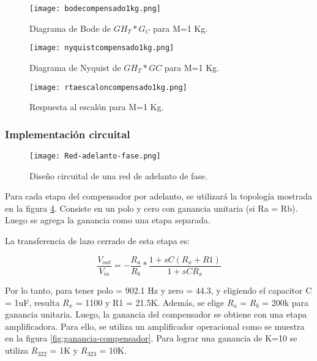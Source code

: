 \begin{figure}[H]
	\centering
	\texttt{[image: bodecompensado1kg.png]}
	\caption{Diagrama de Bode de $GH_T*G_C$ para M=1 Kg.}
	\label{fig:bode-analog-para-M-1Kg}
\end{figure}

\begin{figure}[H]
	\centering
	\texttt{[image: nyquistcompensado1kg.png]}
	\caption{Diagrama de Nyquist de $GH_T*GC$ para M=1 Kg.}
	\label{fig:nyquist-analog-para-M-1Kg}
\end{figure}

\begin{figure}[H]
	\centering
	\texttt{[image: rtaescaloncompensado1kg.png]}
	\caption{Respuesta al escalón para M=1 Kg.}
	\label{fig:respuesta-analog-al-escalon-para-M-1Kg}
\end{figure}

\subsubsection{Implementación circuital}

\begin{figure}[H]
	\centering
	\texttt{[image: Red-adelanto-fase.png]}
	\caption{Diseño circuital de una red de adelanto de fase.}
	\label{fig:red-adelanto-fase}
\end{figure}


\noindent Para cada etapa del compensador por adelanto, se utilizará la topología mostrada en la figura \ref{fig:red-adelanto-fase}. Consiste en  un polo y cero con ganancia unitaria (si Ra = Rb). Luego se agrega la ganancia como una etapa separada.

\noindent La transferencia de lazo cerrado de esta etapa es:

\begin{equation} 
	\frac{V_{out}}{V_{in}}= - \frac{R_a}{R_b}*\frac{1+sC(R_x+R1)}{1+sCR_x}
\end{equation}

\noindent Por lo tanto, para tener polo = 902.1 Hz y zero = 44.3, y eligiendo el capacitor C = 1uF, resulta $R_x$ = 1100 y R1 = 21.5K. Además, se elige $R_a$ = $R_b$ = 200k para ganancia unitaria. Luego, la ganancia del compensador se obtiene con una etapa amplificadora.
Para ello, se utiliza un amplificador operacional como se muestra en la figura \ref{fig:ganancia-compensador}. Para lograr una ganancia de K=10 se utiliza $R_{322}$ = 1K y $R_{323}$ = 10K.


